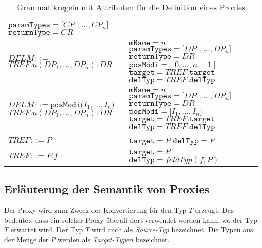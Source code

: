 \documentclass[a4paper,12pt]{article}
\begin{document}
\begin{table}[H]
\begin{tabular}{|p{6cm}|p{8cm}|}
$\texttt{paramTypes} = \mathit{[CP_1},...,\mathit{CP_n]}$\newline
$\texttt{returnType} = \mathit{CR}$
\\
\hline
$\mathit{DELM} ::=$\newline 
$\mathit{TREF}\texttt{.}n(\mathit{DP_1},...,\mathit{DP_n}):DR $  
&
$\texttt{mName} = \mathit{n}$\newline
$\texttt{paramTypes} = \mathit{[DP_1},...,\mathit{DP_n]}$\newline
$\texttt{returnType} = \mathit{DR}$\newline
$\texttt{posModi} = [0,...,\mathit{n}-1]$\newline
$\texttt{target} = \mathit{TREF}\texttt{.target}$\newline
$\texttt{delTyp} = \mathit{TREF}\texttt{.delTyp}$
\\
\hline
$\mathit{DELM} ::=\texttt{posModi(} \mathit{I_1},...,\mathit{I_n} \texttt{)}$\newline
$\mathit{TREF}\texttt{.}n(\mathit{DP_1},...,\mathit{DP_n}):DR $  
&
$\texttt{mName} = \mathit{n}$\newline
$\texttt{paramTypes} = \mathit{[DP_1},...,\mathit{DP_n]}$\newline
$\texttt{returnType} = \mathit{DR}$\newline
$\texttt{posModi} = \mathit{[I_1},...,\mathit{I_n]}$\newline
$\texttt{target} = \mathit{TREF}\texttt{.target}$\newline
$\texttt{delTyp} = \mathit{TREF}\texttt{.delTyp}$
\\
\hline
$\mathit{TREF} ::= \mathit{P}$
& 
$\texttt{target} = \mathit{P}$\newline
$\texttt{delTyp} = \mathit{P}$
\\
\hline
$\mathit{TREF} ::= \mathit{P}\texttt{.}\mathit{f}$
&
$\texttt{target} = \mathit{P}$\newline
$\texttt{delTyp} = \mathit{feldTyp(f,P)}$
\\
\hline
\end{tabular}
\caption{Grammatikregeln mit Attributen für die Definition eines Proxies}
 \label{tab:attrGrProxies}
\end{table}

\newpage
\subsection{Erläuterung der Semantik von Proxies}
Der Proxy wird zum Zweck der Konvertierung für den Typ $T$ erzeugt. Das bedeutet, dass ein solcher Proxy überall dort verwendet werden kann, wo der Typ $T$ erwartet wird. Der Typ $T$ wird auch als \emph{Source-Typ} bezeichnet. Die Typen aus der Menge der $P$ werden als \emph{Target-Typen} bezeichnet.
\end{document}
